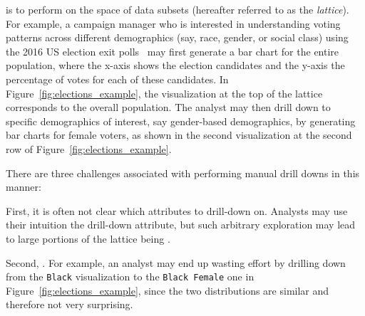 is to perform  
on the space of data subsets 
(hereafter referred to as the \emph{lattice}). 
For example, a campaign manager 
who is interested in understanding 
voting patterns across different 
demographics (say, race, gender, or social class) 
using the 2016 US election exit polls~\cite{exitpolls} 
may first generate a bar chart for the entire population, 
where the x-axis shows the election candidates 
and the y-axis the percentage of votes for each of these candidates. 
In Figure~\ref{fig:elections_example}, 
the visualization at the top of the lattice 
corresponds to the overall population. 
The analyst may then  
drill down to specific demographics of interest, 
say gender-based demographics, 
by generating bar charts for female voters, 
as shown in the second visualization 
at the second row of Figure~\ref{fig:elections_example}.

\par
\noindent 
There are three challenges associated 
with performing manual drill downs in this manner:

\smallskip
\noindent
First, it is often not clear which attributes to 
drill-down on. Analysts may use their 
intuition  the drill-down attribute, 
but such arbitrary exploration  may lead to 
large portions of the lattice being . 

\smallskip
\noindent
Second, . 
For example, an analyst may end up 
wasting effort by drilling down 
from the \texttt{Black} visualization to the \texttt{Black Female} one in Figure~\ref{fig:elections_example}, 
since the two distributions are similar and therefore not very surprising.

